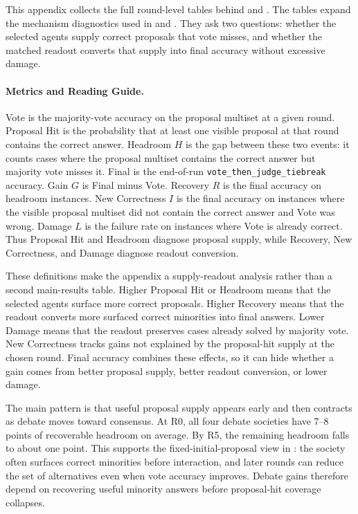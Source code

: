 This appendix collects the full round-level tables behind
 and
. The tables expand the mechanism
diagnostics used in  and . They ask two
questions: whether the selected agents supply correct proposals that vote
misses, and whether the matched readout converts that supply into final
accuracy without excessive damage.

\paragraph{Metrics and Reading Guide.}
Vote is the majority-vote accuracy on the proposal multiset at a given round.
Proposal Hit is the probability that at least one visible proposal at that
round contains the correct answer. Headroom $H$ is the gap between these two
events: it counts cases where the proposal multiset contains the correct answer
but majority vote misses it. Final is the end-of-run
\texttt{vote\_then\_judge\_tiebreak} accuracy. Gain $G$ is Final minus Vote.
Recovery $R$ is the final accuracy on headroom instances. New Correctness $I$
is the final accuracy on instances where the visible proposal multiset did not
contain the correct answer and Vote was wrong. Damage $L$ is the failure rate
on instances where Vote is already correct. Thus Proposal Hit and Headroom
diagnose proposal supply, while Recovery, New Correctness, and Damage diagnose
readout conversion.

These definitions make the appendix a supply-readout analysis rather than a
second main-results table. Higher Proposal Hit or Headroom means that the
selected agents surface more correct proposals. Higher Recovery means that the
readout converts more surfaced correct minorities into final answers. Lower
Damage means that the readout preserves cases already solved by majority vote.
New Correctness tracks gains not explained by the proposal-hit supply at the
chosen round. Final accuracy combines these effects, so it can hide whether a
gain comes from better proposal supply, better readout conversion, or lower
damage.

The main pattern is that useful proposal supply appears early and then contracts
as debate moves toward consensus. At R0, all four debate societies have
7--8 points of recoverable headroom on average. By R5, the remaining headroom
falls to about one point. This supports the fixed-initial-proposal view in
: the society often surfaces correct minorities before
interaction, and later rounds can reduce the set of alternatives even when vote
accuracy improves. Debate gains therefore depend on recovering useful minority
answers before proposal-hit coverage collapses.

